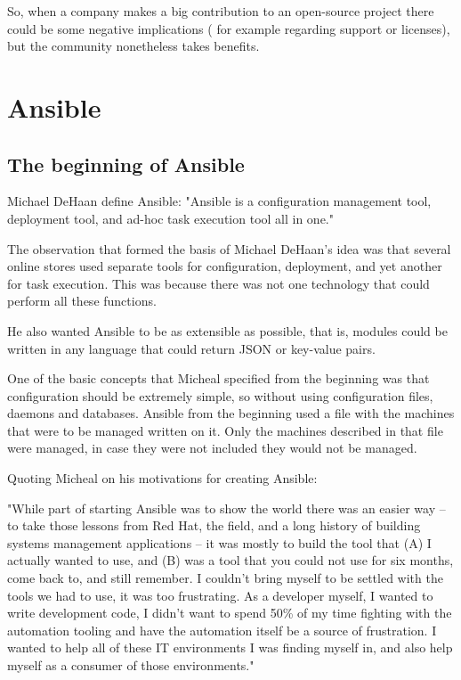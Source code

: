 \documentclass[12pt,a4paper,openright,twoside]{book}
\begin{document}
So, when a company makes a big contribution to an open-source project there could be some negative implications ( for example regarding support or licenses), but the community nonetheless takes benefits.

\chapter{Ansible}

\section{The beginning of Ansible}

Michael DeHaan define Ansible:
"Ansible is a configuration management tool, deployment tool, and ad-hoc task execution tool all in one."


The observation that formed the basis of Michael DeHaan's idea was that several online stores used separate tools for configuration, deployment, and yet another for task execution. This was because there was not one technology that could perform all these functions.


He also wanted Ansible to be as extensible as possible, that is, modules could be written in any language that could return JSON or key-value pairs.

One of the basic concepts that Micheal specified from the beginning was that configuration should be extremely simple, so without using configuration files, daemons and databases. Ansible from the beginning used a file with the machines that were to be managed written on it. Only the machines described in that file were managed, in case they were not included they would not be managed.

Quoting Micheal on his motivations for creating Ansible:


"While part of starting Ansible was to show the world there was an easier way -- to take those lessons from Red Hat, the field, and a long history of building systems management applications -- it was mostly to build the tool that (A) I actually wanted to use, and (B) was a tool that you could not use for six months, come back to, and still remember. I couldn't bring myself to be settled with the tools we had to use, it was too frustrating. As a developer myself, I wanted to write development code, I didn't want to spend 50\% of my time fighting with the automation tooling and have the automation itself be a source of frustration. I wanted to help all of these IT environments I was finding myself in, and also help myself as a consumer of those environments."
\end{document}

